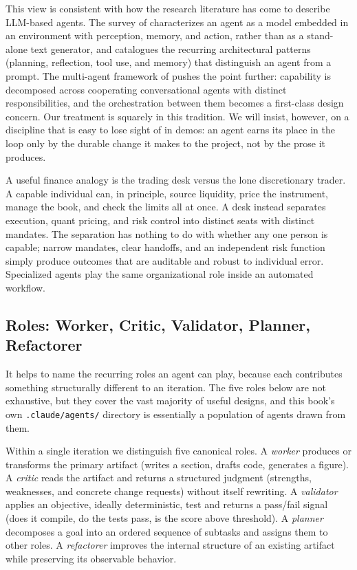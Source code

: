 This view is consistent with how the research literature has come to describe LLM-based agents. The survey of \cite{xi2023rise} characterizes an agent as a model embedded in an environment with perception, memory, and action, rather than as a stand-alone text generator, and \cite{wang2023survey} catalogues the recurring architectural patterns (planning, reflection, tool use, and memory) that distinguish an agent from a prompt. The multi-agent framework of \cite{wu2023autogen} pushes the point further: capability is decomposed across cooperating conversational agents with distinct responsibilities, and the orchestration between them becomes a first-class design concern. Our treatment is squarely in this tradition. We will insist, however, on a discipline that is easy to lose sight of in demos: an agent earns its place in the loop only by the durable change it makes to the project, not by the prose it produces.

\begin{context}
A useful finance analogy is the trading desk versus the lone discretionary trader. A capable individual can, in principle, source liquidity, price the instrument, manage the book, and check the limits all at once. A desk instead separates execution, quant pricing, and risk control into distinct seats with distinct mandates. The separation has nothing to do with whether any one person is capable; narrow mandates, clear handoffs, and an independent risk function simply produce outcomes that are auditable and robust to individual error. Specialized agents play the same organizational role inside an automated workflow.
\end{context}

\subsection{Roles: Worker, Critic, Validator, Planner, Refactorer}\label{subsec:agent-roles}

It helps to name the recurring roles an agent can play, because each contributes something structurally different to an iteration. The five roles below are not exhaustive, but they cover the vast majority of useful designs, and this book's own \texttt{.claude/agents/} directory is essentially a population of agents drawn from them.

\begin{definition}\label{def:agent-roles}
Within a single iteration we distinguish five canonical roles. A \emph{worker} produces or transforms the primary artifact (writes a section, drafts code, generates a figure). A \emph{critic} reads the artifact and returns a structured judgment (strengths, weaknesses, and concrete change requests) without itself rewriting. A \emph{validator} applies an objective, ideally deterministic, test and returns a pass/fail signal (does it compile, do the tests pass, is the score above threshold). A \emph{planner} decomposes a goal into an ordered sequence of subtasks and assigns them to other roles. A \emph{refactorer} improves the internal structure of an existing artifact while preserving its observable behavior.
\end{definition}

